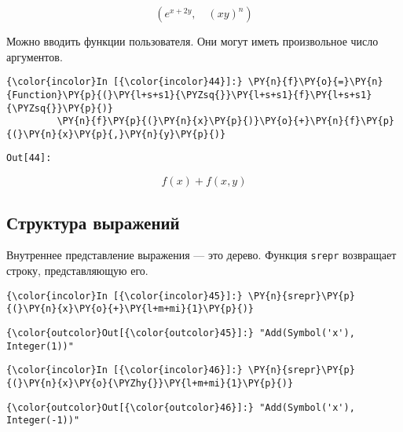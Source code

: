     \[\left ( e^{x + 2 y}, \quad \left(x y\right)^{n}\right )\]

    

    Можно вводить функции пользователя. Они могут иметь произвольное число
аргументов.

    \begin{Verbatim}[commandchars=\\\{\}]
{\color{incolor}In [{\color{incolor}44}]:} \PY{n}{f}\PY{o}{=}\PY{n}{Function}\PY{p}{(}\PY{l+s+s1}{\PYZsq{}}\PY{l+s+s1}{f}\PY{l+s+s1}{\PYZsq{}}\PY{p}{)}
         \PY{n}{f}\PY{p}{(}\PY{n}{x}\PY{p}{)}\PY{o}{+}\PY{n}{f}\PY{p}{(}\PY{n}{x}\PY{p}{,}\PY{n}{y}\PY{p}{)}
\end{Verbatim}
\texttt{\color{outcolor}Out[{\color{outcolor}44}]:}
    
    \[f{\left (x \right )} + f{\left (x,y \right )}\]

    

\subsection{Структура выражений}
\label{sympy04}

Внутреннее представление выражения --- это дерево. Функция \texttt{srepr}
возвращает строку, представляющую его.

    \begin{Verbatim}[commandchars=\\\{\}]
{\color{incolor}In [{\color{incolor}45}]:} \PY{n}{srepr}\PY{p}{(}\PY{n}{x}\PY{o}{+}\PY{l+m+mi}{1}\PY{p}{)}
\end{Verbatim}

            \begin{Verbatim}[commandchars=\\\{\}]
{\color{outcolor}Out[{\color{outcolor}45}]:} "Add(Symbol('x'), Integer(1))"
\end{Verbatim}
        
    \begin{Verbatim}[commandchars=\\\{\}]
{\color{incolor}In [{\color{incolor}46}]:} \PY{n}{srepr}\PY{p}{(}\PY{n}{x}\PY{o}{\PYZhy{}}\PY{l+m+mi}{1}\PY{p}{)}
\end{Verbatim}

            \begin{Verbatim}[commandchars=\\\{\}]
{\color{outcolor}Out[{\color{outcolor}46}]:} "Add(Symbol('x'), Integer(-1))"
\end{Verbatim}
        
